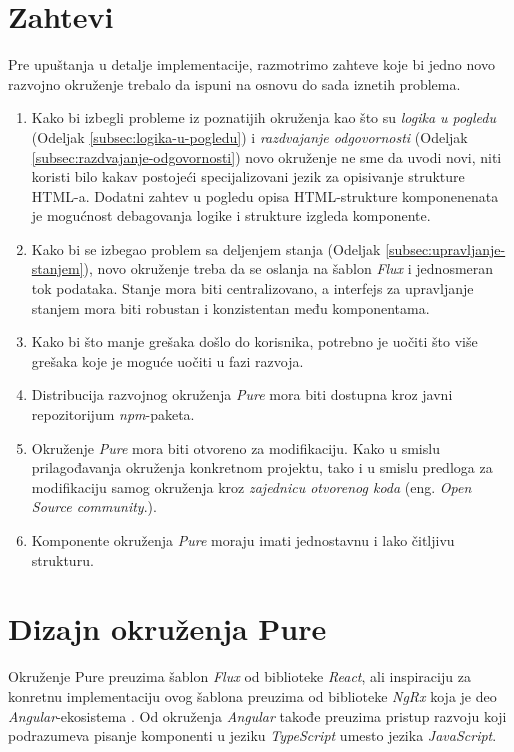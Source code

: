 \documentclass[12pt,oneside]{memoir}
\begin{document}
\section{Zahtevi}\label{sec:zahtevi}
Pre upuštanja u detalje implementacije, razmotrimo zahteve
koje bi jedno novo razvojno okruženje trebalo da ispuni na
osnovu do sada iznetih problema.
\begin{enumerate}
  \item Kako bi izbegli probleme iz poznatijih okruženja kao što su
  \emph{logika u pogledu} (Odeljak \ref{subsec:logika-u-pogledu}) i
  \emph{razdvajanje odgovornosti} (Odeljak \ref{subsec:razdvajanje-odgovornosti})
  novo okruženje ne sme da uvodi novi, niti koristi bilo kakav postojeći
  specijalizovani jezik za opisivanje strukture HTML-a. Dodatni zahtev u pogledu
  opisa HTML-strukture komponenenata je mogućnost debagovanja
  logike i strukture izgleda komponente. \label{zahtev:1}
  \item 
  Kako bi se izbegao problem sa deljenjem stanja (Odeljak \ref{subsec:upravljanje-stanjem}),
  novo okruženje treba da
  se oslanja na šablon \emph{Flux} i jednosmeran tok podataka.
  Stanje mora biti centralizovano, a interfejs za upravljanje stanjem
  mora biti robustan i konzistentan među komponentama.
  \label{zahtev:2}
 \item Kako bi što manje grešaka došlo do korisnika, potrebno je uočiti
 što više grešaka koje je moguće uočiti u fazi razvoja.
 \label{zahtev:3}
 \item Distribucija razvojnog okruženja \emph{Pure} mora biti dostupna kroz
 javni repozitorijum \emph{npm}-paketa. \label{zahtev:4}
 \item Okruženje \emph{Pure} mora biti otvoreno za modifikaciju. Kako u smislu prilagođavanja okruženja konkretnom projektu,
tako i u smislu predloga za modifikaciju samog okruženja kroz \emph{zajednicu otvorenog koda} (eng. \emph{Open Source community}.). \label{zahtev:5}
 \item Komponente okruženja \emph{Pure} moraju imati jednostavnu i lako čitljivu strukturu. \label{zahtev:6}
\end{enumerate}

\section{Dizajn okruženja Pure}
Okruženje Pure preuzima šablon \emph{Flux} od biblioteke \emph{React}, ali inspiraciju za konretnu implementaciju ovog šablona
preuzima od biblioteke \emph{NgRx} koja je deo \emph{Angular}-ekosistema \cite{NgRx}. Od okruženja \emph{Angular}
takođe preuzima pristup razvoju koji podrazumeva pisanje komponenti u jeziku \emph{TypeScript} umesto jezika \emph{JavaScript}.
\end{document}
